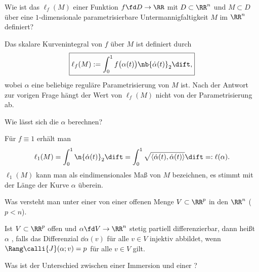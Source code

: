 \begin{frage}
  Wie ist das  
  $\ell_f (M)$ einer Funktion $f\fd D \to \RR$ mit $D\subset\RR^n$ 
  und $M\subset D$ über eine $1$-dimensionale parametrisierbare 
  Untermannigfaltigkeit $M$ im $\RR^n$ definiert?
\end{frage}

\begin{antwort}
  Das skalare Kurvenintegral von $f$ über $M$ ist definiert durch
  \[
  \boxed{
    \ell_f (M) := \int_0^1 f \big(\alpha(t)\big) \nb{\dot{\alpha}(t) }_2 \dift, 
  }
  \]
  wobei $\alpha$ eine beliebige reguläre Parametrisierung von $M$ ist. 
  Nach der Antwort zur vorigen Frage hängt der Wert von $\ell_f(M)$ nicht 
  von der Parametrisierung ab. \AntEnd
\end{antwort} 

\begin{frage}
  Wie lässt sich die  $\alpha$ berechnen?
\end{frage}

\begin{antwort}
  Für $f \equiv 1$ erhält man 
  \[
  \ell_1 (M) = \int_0^1 \n{\dot{\alpha}(t)}_2\dift = 
  \int_0^1 \sqrt{ \langle \dot{\alpha}(t), \dot{\alpha}(t) \rangle }\dift
  = : \ell (\alpha ). 
  \]
  $\ell_1(M)$ kann man als eindimensionales Maß von $M$ bezeichnen, 
  es stimmt mit der Länge der Kurve $\alpha$ überein.
  \AntEnd
\end{antwort} 

\begin{frage}
  Was versteht man unter einer  von einer offenen Menge 
  $V\subset\RR^p$ in den $\RR^n$ ($p<n$).
\end{frage}

\begin{antwort}
  Ist $V\subset\RR^p$ offen und $\alpha\fd V\to\RR^n$ stetig partiell 
  differenzierbar, dann heißt $\alpha$
  , falls das Differenzial 
  $\dd\alpha(v)$ für alle $v\in V$ injektiv abbildet, {\dasheisst} wenn 
  $\Rang \calli{J}(\alpha;v)=p$ für alle $v\in V$ gilt. 
  \AntEnd
\end{antwort} 

\begin{frage}
  Was ist der Unterschied zwischen einer Immersion und einer 
  ?
\end{frage}

